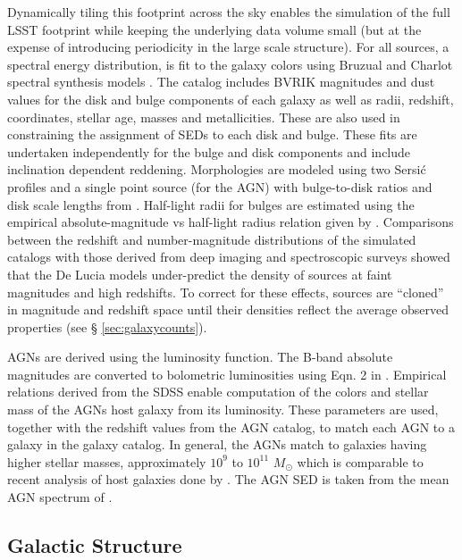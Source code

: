 \documentclass[]{article}
\begin{document}
{Dynamically tiling this footprint across the sky enables the
simulation of the full LSST footprint while keeping the underlying
data volume small (but at the expense of introducing periodicity in
the large scale structure).  For all sources, a spectral energy
distribution, is fit to the galaxy colors using Bruzual and Charlot
spectral synthesis models \citep{bruzual}. The
\citet{delucia} catalog includes BVRIK magnitudes and dust values for
the disk and bulge components of each galaxy as well as radii,
redshift, coordinates, stellar age, masses and metallicities. These
are also used in constraining the assignment of SEDs to each disk and bulge.
These fits are undertaken independently for the bulge and disk components and
include inclination dependent reddening. Morphologies are modeled using two
Sersi{\'c} profiles and a single point source (for the AGN) with
bulge-to-disk ratios and disk scale lengths from \citet{delucia}.
 Half-light radii for bulges are estimated using the empirical
absolute-magnitude vs half-light radius relation given by 
\citet{gonzalez09}.  Comparisons between the redshift and
number-magnitude distributions of the simulated catalogs with those
derived from deep imaging and spectroscopic surveys showed that the De
Lucia models under-predict the density of sources at faint magnitudes
and high redshifts. To correct for these effects, sources are
``cloned'' in magnitude and redshift space until their densities
reflect the average observed properties (see \S
\ref{sec:galaxycounts}). 

AGNs are derived using the \citet{bongiorno12} luminosity
function. The B-band absolute magnitudes are converted to bolometric
luminosities using Eqn. 2 in \citet{hopkins07}. Empirical relations
derived from the SDSS enable computation of the colors and stellar
mass of the AGNs host galaxy from its luminosity. These parameters are
used, together with the redshift values from the AGN catalog, to match
each AGN to a galaxy in the galaxy catalog. In general, the AGNs match
to galaxies having higher stellar masses, approximately $10^{9}$ to
$10^{11}$ $M_{\odot}$ which is comparable to recent analysis of host
galaxies done by \citet{xue11}. The AGN SED is taken from the mean AGN
spectrum of \citet{vandenberk}.

\subsection{Galactic Structure \label{sec:stars}}

}
\end{document}
